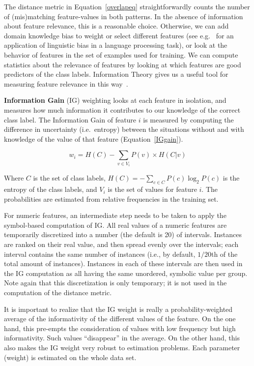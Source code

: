 \documentclass{report}
\begin{document}
The distance metric in Equation~\ref{overlapeq} straightforwardly counts the
number of (mis)matching feature-values in both patterns. In the
absence of information about feature relevance, this is a reasonable
choice. Otherwise, we can add domain knowledge bias to weight or
select different features (see e.g.~ for an
application of linguistic bias in a language processing task), or look
at the behavior of features in the set of examples used for
training. We can compute statistics about the relevance of features by
looking at which features are good predictors of the class
labels. Information Theory gives us a useful tool for measuring
feature relevance in this way~\cite{Quinlan86,Quinlan93}.

{\bf Information Gain} (IG) weighting looks at each feature in
isolation, and measures how much information it contributes to our
knowledge of the correct class label. The Information Gain of feature
$i$ is measured by computing the difference in uncertainty
(i.e.\ entropy) between the situations without and with knowledge of
the value of that feature (Equation~\ref{IGgain}).

\begin{equation}
w_{i} = H(C) -  \sum_{v \in V_{i}} P(v) \times H(C|v)
\label{IGgain}
\end{equation}

Where $C$ is the set of class labels, $H(C) = - \sum_{c \in C} P(c) \log_{2} P(c)$ is the entropy of the class labels, and $V_{i}$ is the set of values for feature $i$. The probabilities are estimated from relative frequencies in the training set.

For numeric features, an intermediate step needs to be taken to apply
the symbol-based computation of IG. All real values of a numeric
features are temporarily discretized into a number (the default is 20)
of intervals. Instances are ranked on their real value, and then
spread evenly over the intervals; each interval contains the same
number of instances (i.e., by default, $1/20$th of the total amount of
instances). Instances in each of these intervals are then used in the
IG computation as all having the same unordered, symbolic value per
group. Note again that this discretization is only temporary; it is
not used in the computation of the distance metric.

It is important to realize that the IG weight is really a
probability-weighted average of the informativity of the different
values of the feature. On the one hand, this pre-empts the
consideration of values with low frequency but high
informativity. Such values ``disappear'' in the average. On the other
hand, this also makes the IG weight very robust to estimation
problems. Each parameter (weight) is estimated on the whole data set.
\end{document}
